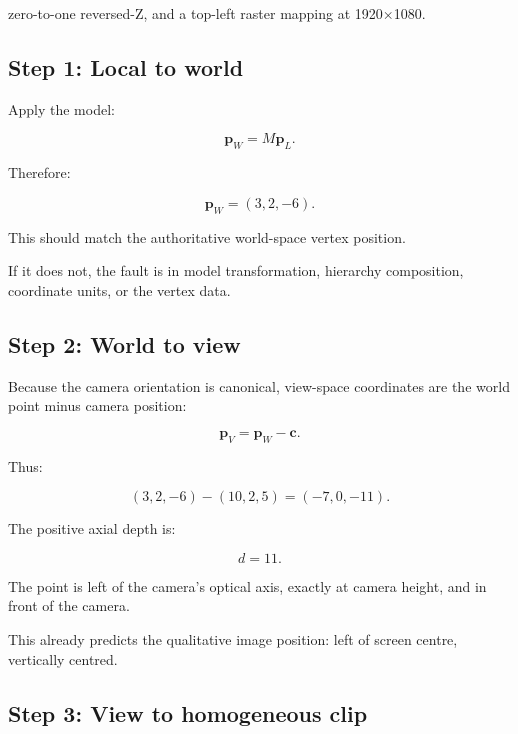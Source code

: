 zero-to-one reversed-Z, and a top-left raster mapping at 1920×1080.

\subsection{Step 1: Local to world}\label{02-foundations-ii-ch037-step-1-local-to-world}

\hypertarget{02-foundations-ii-ch037-step-1-local-to-world}{}

Apply the model:

\[ \mathbf p_W=M\mathbf p_L. \]

Therefore:

\[ \boxed{ \mathbf p_W=(3,2,-6). } \]

This should match the authoritative world-space vertex position.

If it does not, the fault is in model transformation, hierarchy composition, coordinate units, or the vertex data.

\subsection{Step 2: World to view}\label{02-foundations-ii-ch037-step-2-world-to-view}

\hypertarget{02-foundations-ii-ch037-step-2-world-to-view}{}

Because the camera orientation is canonical, view-space coordinates are the world point minus camera position:

\[ \mathbf p_V=\mathbf p_W-\mathbf c. \]

Thus:

\[ (3,2,-6)-(10,2,5) = \boxed{(-7,0,-11)}. \]

The positive axial depth is:

\[ \boxed{d=11}. \]

The point is left of the camera's optical axis, exactly at camera height, and in front of the camera.

This already predicts the qualitative image position: left of screen centre, vertically centred.

\subsection{Step 3: View to homogeneous clip}\label{02-foundations-ii-ch037-step-3-view-to-homogeneous-clip}

\hypertarget{02-foundations-ii-ch037-step-3-view-to-homogeneous-clip}{}

